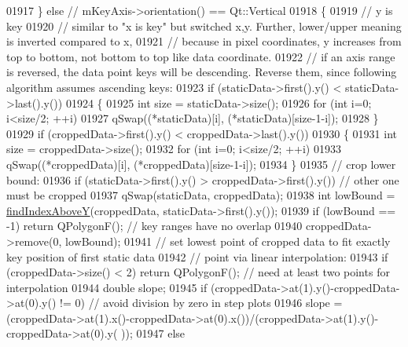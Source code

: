 \begin{DoxyCode}
01917   \} \textcolor{keywordflow}{else} \textcolor{comment}{// mKeyAxis->orientation() == Qt::Vertical}
01918   \{
01919     \textcolor{comment}{// y is key}
01920     \textcolor{comment}{// similar to "x is key" but switched x,y. Further, lower/upper meaning is inverted compared to x,}
01921     \textcolor{comment}{// because in pixel coordinates, y increases from top to bottom, not bottom to top like data
       coordinate.}
01922     \textcolor{comment}{// if an axis range is reversed, the data point keys will be descending. Reverse them, since following
       algorithm assumes ascending keys:}
01923     \textcolor{keywordflow}{if} (staticData->first().y() < staticData->last().y())
01924     \{
01925       \textcolor{keywordtype}{int} size = staticData->size();
01926       \textcolor{keywordflow}{for} (\textcolor{keywordtype}{int} i=0; i<size/2; ++i)
01927         qSwap((*staticData)[i], (*staticData)[size-1-i]);
01928     \}
01929     \textcolor{keywordflow}{if} (croppedData->first().y() < croppedData->last().y())
01930     \{
01931       \textcolor{keywordtype}{int} size = croppedData->size();
01932       \textcolor{keywordflow}{for} (\textcolor{keywordtype}{int} i=0; i<size/2; ++i)
01933         qSwap((*croppedData)[i], (*croppedData)[size-1-i]);
01934     \}
01935     \textcolor{comment}{// crop lower bound:}
01936     \textcolor{keywordflow}{if} (staticData->first().y() > croppedData->first().y()) \textcolor{comment}{// other one must be cropped}
01937       qSwap(staticData, croppedData);
01938     \textcolor{keywordtype}{int} lowBound = \hyperlink{a00031_adf50243f1df203883a2187089734bfcb}{findIndexAboveY}(croppedData, staticData->first().y());
01939     \textcolor{keywordflow}{if} (lowBound == -1) \textcolor{keywordflow}{return} QPolygonF(); \textcolor{comment}{// key ranges have no overlap}
01940     croppedData->remove(0, lowBound);
01941     \textcolor{comment}{// set lowest point of cropped data to fit exactly key position of first static data}
01942     \textcolor{comment}{// point via linear interpolation:}
01943     \textcolor{keywordflow}{if} (croppedData->size() < 2) \textcolor{keywordflow}{return} QPolygonF(); \textcolor{comment}{// need at least two points for interpolation}
01944     \textcolor{keywordtype}{double} slope;
01945     \textcolor{keywordflow}{if} (croppedData->at(1).y()-croppedData->at(0).y() != 0) \textcolor{comment}{// avoid division by zero in step plots}
01946       slope = (croppedData->at(1).x()-croppedData->at(0).x())/(croppedData->at(1).y()-croppedData->at(0).y(
      ));
01947     \textcolor{keywordflow}{else}

\end{DoxyCode}
